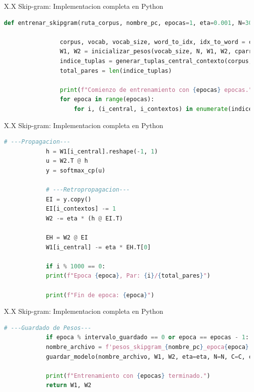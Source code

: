 \documentclass{beamer}
\begin{document}
\begin{frame}[fragile]{X.X Skip-gram: Implementacion completa en Python}
	
	\begin{block}{}
		\begin{lstlisting}[language=Python]
			def entrenar_skipgram(ruta_corpus, nombre_pc, epocas=1, eta=0.001, N=300, C=4, W1=None, W2=None, intervalo_guardado=50):
			
				corpus, vocab, vocab_size, word_to_idx, idx_to_word = cargar_corpus(ruta_corpus)
				W1, W2 = inicializar_pesos(vocab_size, N, W1, W2, cparray=True)
				indice_tuplas = generar_tuplas_central_contexto(corpus, word_to_idx, C)
				total_pares = len(indice_tuplas)
				
				print(f"Comienzo de entrenamiento con {epocas} epocas.")
				for epoca in range(epocas):
					for i, (i_central, i_contextos) in enumerate(indice_tuplas):              
		\end{lstlisting}
	\end{block}
\end{frame}

\begin{frame}[fragile]{X.X Skip-gram: Implementacion completa en Python}
	
	\begin{block}{}
		\begin{lstlisting}[language=Python]
			# ---Propagacion---
			h = W1[i_central].reshape(-1, 1)
			u = W2.T @ h
			y = softmax_cp(u)
			
			# ---Retropropagacion---
			EI = y.copy()
			EI[i_contextos] -= 1
			W2 -= eta * (h @ EI.T)
			
			EH = W2 @ EI
			W1[i_central] -= eta * EH.T[0]
			
			if i % 1000 == 0:
			print(f"Epoca {epoca}, Par: {i}/{total_pares}")
			
			print(f"Fin de epoca: {epoca}")                
		\end{lstlisting}
	\end{block}
\end{frame}

\begin{frame}[fragile]{X.X Skip-gram: Implementacion completa en Python}
	
	\begin{block}{}
		\begin{lstlisting}[language=Python]
			# ---Guardado de Pesos---
			if epoca % intervalo_guardado == 0 or epoca == epocas - 1:
			nombre_archivo = f'pesos_skipgram_{nombre_pc}_epoca{epoca}.npz'
			guardar_modelo(nombre_archivo, W1, W2, eta=eta, N=N, C=C, cparray=True)
			
			print(f"Entrenamiento con {epocas} terminado.")
			return W1, W2                
		\end{lstlisting}
	\end{block}
\end{frame}
\end{document}

